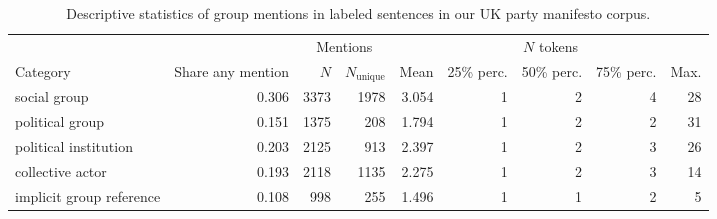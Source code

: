 \begin{table}[!t]

\caption{\label{tab:mention_descriptives_uk_mans}Descriptive statistics of group mentions in labeled sentences in our UK party manifesto corpus.}
\centering
\fontsize{10}{12}\selectfont
\begin{tabular}[t]{lrrrrrrrr}
\toprule
\multicolumn{2}{c}{ } & \multicolumn{2}{c}{Mentions} & \multicolumn{5}{c}{$N$ tokens} \\
\cmidrule(l{3pt}r{3pt}){3-4} \cmidrule(l{3pt}r{3pt}){5-9}
Category & Share any mention & $N$ & $N_{\text{unique}}$ & Mean & 25\% perc. & 50\% perc. & 75\% perc. & Max.\\
\midrule
social group & 0.306 & 3373 & 1978 & 3.054 & 1 & 2 & 4 & 28\\
political group & 0.151 & 1375 & 208 & 1.794 & 1 & 2 & 2 & 31\\
political institution & 0.203 & 2125 & 913 & 2.397 & 1 & 2 & 3 & 26\\
collective actor & 0.193 & 2118 & 1135 & 2.275 & 1 & 2 & 3 & 14\\
implicit group reference & 0.108 & 998 & 255 & 1.496 & 1 & 1 & 2 & 5\\
\bottomrule
\end{tabular}
\end{table}
